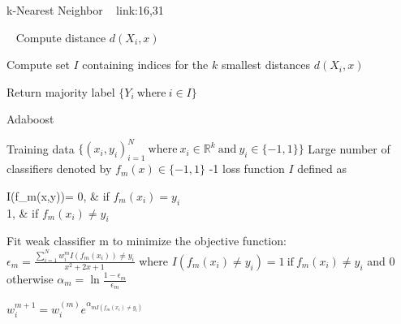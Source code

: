 \documentclass[a4paper]{article}
\begin{document}
  \begin{algorithm}
 
   \caption{k-Nearest Neighbor  ~ \cite{knearest91} link:{16,31} }
    \begin{algorithmic}[1]
      \
            \State Compute distance $d{(X_i,x)}$
        \EndFor
        
         \State Compute set $I$ containing indices for the $k$ smallest distances $d{(X_i,x)}$
     
       \State Return majority label $\{Y_i \ \text{where}\ i \in I \}$



 \EndFunction
 


\end{algorithmic}
\end{algorithm}






  \begin{algorithm}
   \caption{Adaboost  ~ \cite{adaboostfirst}}
    \begin{algorithmic}[1]
    \INPUT 
    \Statex Training data $\{(x_i,y_i)_{i=1}^N \ \text{where}\ x_i \in  \mathbb{R}^k \ \text{and} \  y_i \in \{-1,1\} \}$
    \Statex Large number of classifiers denoted by $f_m(x) \in \{-1,1\} $
    \Statex 0-1 loss function $I$ defined as 
 \begin{numcases}{ I(f_m(x,y))=}
  0, & if $ f_m(x_i) = y_i $\\
  1, &  if $ f_m(x_i) \neq y_i $
\end{numcases}
     
            \State Fit weak classifier m to minimize the objective function:
            \State $\epsilon_m =  \frac{\sum_{i=1}^N w_{i}^m I(f_m(x_i)) \neq y_i}{x^2+2x+1} $
            \State where  $I(f_m(x_i) \neq y_i) =1 \  \text{if} \ f_m(x_i) \neq y_i  $ and 0 otherwise
            \State $\alpha_m = \ln \frac{1- \epsilon_m}{\epsilon_m}$
            
        \EndFor
              \State $w_{i}^ {m+1} = w_{i} ^{(m)} e^{\alpha_{mI(f_m(x_i) \neq y_i)}} $ 
         \EndFor 
         
        
        \EndFor
        
        


\end{algorithmic}
\end{algorithm}
\end{document}
